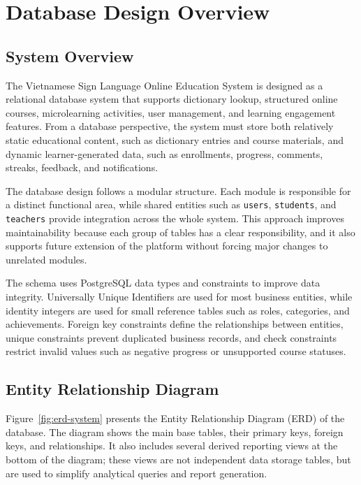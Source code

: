 \chapter{Database Design Overview}

\section{System Overview}

The Vietnamese Sign Language Online Education System is designed as a relational database system that supports dictionary lookup, structured online courses, microlearning activities, user management, and learning engagement features. From a database perspective, the system must store both relatively static educational content, such as dictionary entries and course materials, and dynamic learner-generated data, such as enrollments, progress, comments, streaks, feedback, and notifications.

The database design follows a modular structure. Each module is responsible for a distinct functional area, while shared entities such as \texttt{users}, \texttt{students}, and \texttt{teachers} provide integration across the whole system. This approach improves maintainability because each group of tables has a clear responsibility, and it also supports future extension of the platform without forcing major changes to unrelated modules.

The schema uses PostgreSQL data types and constraints to improve data integrity. Universally Unique Identifiers are used for most business entities, while identity integers are used for small reference tables such as roles, categories, and achievements. Foreign key constraints define the relationships between entities, unique constraints prevent duplicated business records, and check constraints restrict invalid values such as negative progress or unsupported course statuses.

\section{Entity Relationship Diagram}

Figure~\ref{fig:erd-system} presents the Entity Relationship Diagram (ERD) of the database. The diagram shows the main base tables, their primary keys, foreign keys, and relationships. It also includes several derived reporting views at the bottom of the diagram; these views are not independent data storage tables, but are used to simplify analytical queries and report generation.

